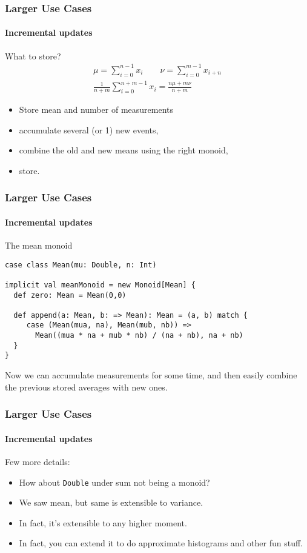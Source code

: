 \documentclass{beamer}
\begin{document}
\begin{framej}
\begin{frame}
\end{frame}

\begin{frame}
  \frametitle{Larger Use Cases}
  \framesubtitle{Incremental updates}
  What to store?
  \[
  \begin{split}
    \mu = \sum_{i=0}^{n-1} x_i \qquad  \nu = \sum_{i=0}^{m-1} x_{i+n} \\
    \frac{1}{n+m} \sum_{i=0}^{n+m-1} x_i = \frac{n\mu + m\nu} {n+m}
  \end{split}
  \]

  \pause

  \begin{itemize}
  \item Store mean and number of measurements
  \item accumulate several (or 1) new events,
  \item combine the old and new means using the right \alert{monoid},
  \item store.
  \end{itemize}
\end{frame}

\begin{frame}[fragile]
  \frametitle{Larger Use Cases}
  \framesubtitle{Incremental updates}
  \begin{block}{The mean monoid}
  \begin{lstlisting}
case class Mean(mu: Double, n: Int)

implicit val meanMonoid = new Monoid[Mean] {
  def zero: Mean = Mean(0,0)

  def append(a: Mean, b: => Mean): Mean = (a, b) match {
     case (Mean(mua, na), Mean(mub, nb)) =>
       Mean((mua * na + mub * nb) / (na + nb), na + nb)
  }
}
  \end{lstlisting}
  \end{block}
  Now we can accumulate measurements for some time, and then easily
  combine the previous stored averages with new ones.
\end{frame}

\begin{frame}
  \frametitle{Larger Use Cases}
  \framesubtitle{Incremental updates}
  Few more details:
  \begin{itemize}
    \item How about \texttt{Double} under sum not being a monoid?
  \item We saw mean, but same is extensible to variance.
  \item In fact, it's extensible to any higher moment.
  \item In fact, you can extend it to do approximate histograms and other fun stuff.
  \end{itemize}


\end{frame}
\end{framej}
\end{document}
